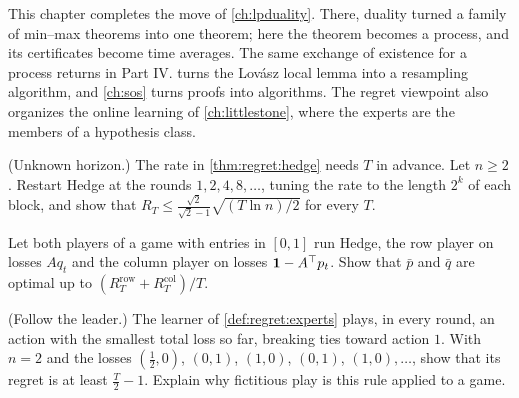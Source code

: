 \begin{refsection}

This chapter completes the move of \cref{ch:lpduality}. There, duality turned a family of min--max theorems into one theorem; here the theorem becomes a process, and its certificates become time averages. The same exchange of existence for a process returns in Part IV.  turns the Lov\'asz local lemma into a resampling algorithm, and \cref{ch:sos} turns proofs into algorithms. The regret viewpoint also organizes the online learning of \cref{ch:littlestone}, where the experts are the members of a hypothesis class.

\begin{exercises}
\item \consolidation (Unknown horizon.) The rate in \cref{thm:regret:hedge} needs $T$ in advance. Let $n\ge2$. Restart Hedge at the rounds $1,2,4,8,\dots$, tuning the rate to the length $2^k$ of each block, and show that $R_T\le\frac{\sqrt2}{\sqrt2-1}\sqrt{(T\ln n)/2}$ for every $T$. \label{ex:regret:doubling}

\item \consolidation Let both players of a game with entries in $[0,1]$ run Hedge, the row player on losses $Aq_t$ and the column player on losses $\mathbf{1}-A^\top p_t$. Show that $\bar p$ and $\bar q$ are optimal up to $(R^{\mathrm{row}}_T+R^{\mathrm{col}}_T)/T$.\label{ex:regret:twohedges}

\item \consolidation (Follow the leader.) The learner of \cref{def:regret:experts} plays, in every round, an action with the smallest total loss so far, breaking ties toward action $1$. With $n=2$ and the losses $(\frac12,0)$, $(0,1)$, $(1,0)$, $(0,1)$, $(1,0),\dots$, show that its regret is at least $\frac T2-1$. Explain why fictitious play is this rule applied to a game.\label{ex:regret:ftl}


\end{exercises}
\end{refsection}
